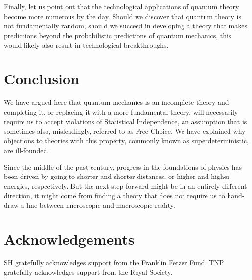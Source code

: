 \documentclass[12pt]{article}
\begin{document}
Finally, let us point out that the technological applications of quantum theory become more numerous by the day. Should we discover that quantum theory is not fundamentally random, should we succeed in developing a theory that makes predictions beyond the probabilistic predictions of quantum mechanics, this would likely also result in technological breakthroughs. 

\section{Conclusion}

We have argued here that quantum mechanics is an incomplete theory and completing it, or replacing it with a more fundamental theory, will necessarily require us to accept violations of Statistical Independence, an assumption that is sometimes also, misleadingly, referred to as Free Choice. We have explained why objections to theories with this property, commonly known as superdeterministic, are ill-founded. 

Since the middle of the past century, progress in the foundations of physics has been driven by going to shorter and shorter distances, or higher and higher energies, respectively. But the next step forward might be in an entirely different direction, it might come from finding a theory that does not require us to hand-draw a line between microscopic and macroscopic reality.

\section*{Acknowledgements}

SH gratefully acknowledges support from the Franklin Fetzer Fund. TNP gratefully acknowledges support from the Royal Society. 
\end{document}
